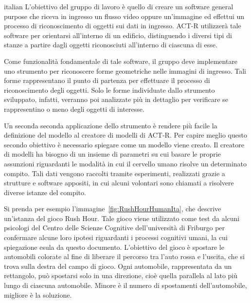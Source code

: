 \begin{otherlanguage*}{italian}
		L'obiettivo del gruppo di lavoro è quello di creare un software general purpose che riceva in ingresso un flusso video oppure un'immagine ed effettui un processo di riconoscimento di oggetti sui dati in ingresso.
		\mbox{ACT-R} utilizzerà tale software per orientarsi all'interno di un edificio, distinguendo i diversi tipi di stanze a partire dagli oggetti riconosciuti all'interno di ciascuna di esse.

		Come funzionalità fondamentale di tale software, il gruppo deve implementare uno strumento per riconoscere forme geometriche nelle immagini di ingresso. 
		Tali forme rappresentano il punto di partenza per effettuare il processo di riconoscimento degli oggetti. 
		Solo le forme individuate dallo strumento sviluppato, infatti, verranno poi analizzate più in dettaglio per verificare se rappresentino o meno degli oggetti di interesse.

		Un seconda seconda applicazione dello strumento è rendere più facile la definizione del modello al creatore di modelli di \mbox{ACT-R}.
		Per capire meglio questo secondo obiettivo è necessario spiegare come un modello viene creato.
		Il creatore di modelli ha bisogno di un insieme di parametri su cui basare le proprie assunzioni riguardanti le modalità in cui il cervello umano risolve un determinato compito.
		Tali dati vengono raccolti tramite esperimenti, realizzati grazie a strutture e software appositi, in cui alcuni volontari sono chiamati a risolvere diverse istanze del compito.
		
		Si prenda per esempio l'immagine~\ref{fig:RushHourHumanIta}, che descrive un'istanza del gioco Rush Hour.
		Tale gioco viene utilizzato come test da alcuni psicologi del Centro delle Scienze Cognitive dell'università di Friburgo per confermare alcune loro ipotesi riguardanti i processi cognitivi umani, la cui spiegazione esula da questo documento.
		L'obiettivo del gioco è spostare le automobili colorate al fine di liberare il percorso tra l'auto rossa e l'uscita, che si trova sulla destra del campo di gioco.
		Ogni automobile, rappresentata da un rettangolo, può spostarsi solo in una direzione, cioè quella parallela al lato più lungo di ciascuna automobile.
		Minore è il numero di spostamenti dell'automobile, migliore è la soluzione. 	


\end{otherlanguage*}
